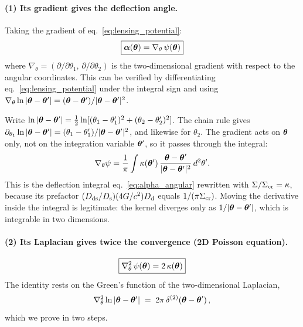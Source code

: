 \paragraph{(1) Its gradient gives the deflection angle.}
Taking the gradient of eq.~\eqref{eq:lensing_potential}:
\begin{equation}
    \boxed{
    \boldsymbol{\alpha}(\boldsymbol{\theta}) = \nabla_\theta\, \psi(\boldsymbol{\theta})
    }
    \label{eq:alpha_grad_psi}
\end{equation}
where $\nabla_\theta = (\partial/\partial\theta_1,\,
\partial/\partial\theta_2)$ is the two-dimensional gradient with
respect to the angular coordinates.  This can be verified by
differentiating eq.~\eqref{eq:lensing_potential} under the integral
sign and using $\nabla_\theta \ln|\boldsymbol{\theta} - \boldsymbol{\theta}'| =
(\boldsymbol{\theta} - \boldsymbol{\theta}')/|\boldsymbol{\theta} - \boldsymbol{\theta}'|^2$.
\begin{derivation}
Write $\ln|\boldsymbol{\theta} - \boldsymbol{\theta}'| = \tfrac12\ln[(\theta_1 - \theta_1')^2 + (\theta_2 - \theta_2')^2]$.
The chain rule gives
$\partial_{\theta_1}\ln|\boldsymbol{\theta} - \boldsymbol{\theta}'| = (\theta_1 - \theta_1')/|\boldsymbol{\theta} - \boldsymbol{\theta}'|^2$,
and likewise for $\theta_2$. The gradient acts on $\boldsymbol{\theta}$ only, not on the
integration variable $\boldsymbol{\theta}'$, so it passes through the integral:
\begin{equation*}
    \nabla_\theta\psi = \frac{1}{\pi}\int\kappa(\boldsymbol{\theta}')\,
    \frac{\boldsymbol{\theta} - \boldsymbol{\theta}'}{|\boldsymbol{\theta} - \boldsymbol{\theta}'|^2}\,d^2\theta' .
\end{equation*}
This is the deflection integral eq.~\eqref{eq:alpha_angular} rewritten with
$\Sigma/\Sigma_{\mathrm{cr}} = \kappa$, because its prefactor
$(D_{\mathrm{ds}}/D_{\mathrm{s}})(4G/c^2)D_{\mathrm{d}}$ equals $1/(\pi\Sigma_{\mathrm{cr}})$. Moving the
derivative inside the integral is legitimate: the kernel diverges only as
$1/|\boldsymbol{\theta} - \boldsymbol{\theta}'|$, which is integrable in two dimensions.
\end{derivation}

\paragraph{(2) Its Laplacian gives twice the convergence (2D Poisson equation).}
\begin{equation}
    \boxed{
    \nabla^2_\theta\, \psi(\boldsymbol{\theta}) = 2\,\kappa(\boldsymbol{\theta})
    }
    \label{eq:poisson_2d}
\end{equation}
The identity rests on the Green's function of the two-dimensional
Laplacian,
\begin{equation}
    \nabla^2_\theta \ln|\boldsymbol{\theta} - \boldsymbol{\theta}'|
    \;=\; 2\pi\,\delta^{(2)}(\boldsymbol{\theta} - \boldsymbol{\theta}') \,,
    \label{eq:green_2d}
\end{equation}
which we prove in two steps.

